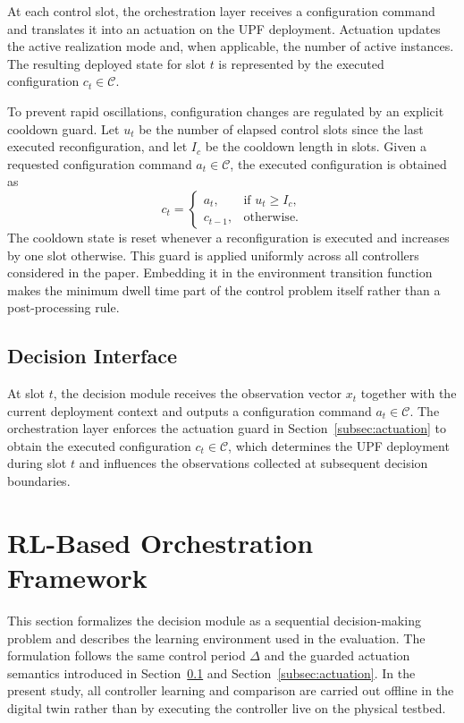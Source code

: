 \documentclass[a4paper,fleqn]{cas-sc}
\begin{document}
At each control slot, the orchestration layer receives a configuration command and translates it into an actuation on the UPF deployment. Actuation updates the active realization mode and, when applicable, the number of active instances. The resulting deployed state for slot $t$ is represented by the executed configuration $c_t\in\mathcal{C}$.

To prevent rapid oscillations, configuration changes are regulated by an explicit cooldown guard. Let $u_t$ be the number of elapsed control slots since the last executed reconfiguration, and let $I_c$ be the cooldown length in slots. Given a requested configuration command $a_t\in\mathcal{C}$, the executed configuration is obtained as
\begin{equation}
    c_t =
    \begin{cases}
        a_t, & \text{if } u_t \ge I_c,\\
        c_{t-1}, & \text{otherwise}.
    \end{cases}
    \label{eq:cooldown_guard}
\end{equation}
The cooldown state is reset whenever a reconfiguration is executed and increases by one slot otherwise. This guard is applied uniformly across all controllers considered in the paper. Embedding it in the environment transition function makes the minimum dwell time part of the control problem itself rather than a post-processing rule.

\subsection{Decision Interface}
\label{subsec:decision_interface}

At slot $t$, the decision module receives the observation vector $x_t$ together with the current deployment context and outputs a configuration command $a_t\in\mathcal{C}$. The orchestration layer enforces the actuation guard in Section~\ref{subsec:actuation} to obtain the executed configuration $c_t\in\mathcal{C}$, which determines the UPF deployment during slot $t$ and influences the observations collected at subsequent decision boundaries.

\section{RL-Based Orchestration Framework}
\label{method}

This section formalizes the decision module as a sequential decision-making problem and describes the learning environment used in the evaluation. The formulation follows the same control period $\Delta$ and the guarded actuation semantics introduced in Section~\ref{subsec:decision_interface} and Section~\ref{subsec:actuation}. In the present study, all controller learning and comparison are carried out offline in the digital twin rather than by executing the controller live on the physical testbed.
\end{document}
